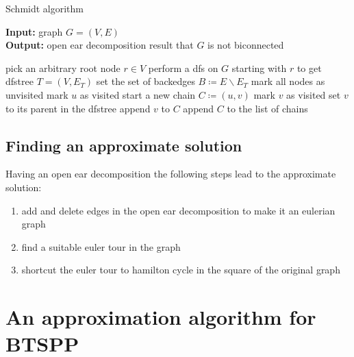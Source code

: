 \begin{algorithm}
  \caption{Schmidt algorithm}\label{alg:schmidt}
  \textbf{Input: } graph \(G = (V, E)\)\\
  \textbf{Output: } open ear decomposition result that \(G\) is not biconnected
  \begin{algorithmic}[1]
      \State pick an arbitrary root node \(r \in V\)
      \State perform a \gls{dfs} on \(G\) starting with \(r\) to get \gls{dfstree} \(T = (V, E_T)\)
        \State{}
      \EndIf
      \State set the set of backedges \(B \coloneqq E \backslash E_T\)
      \State mark all nodes as unvisited
            \State mark \(u\) as visited
            \State start a new chain \(C \coloneqq (u, v)\)
              \State mark \(v\) as visited
              \State set \(v\) to its parent in the \gls{dfstree}
              \State append \(v\) to \(C\)
                \State{}
              \EndIf
            \EndWhile
            \State append \(C\) to the list of chains
          \EndIf
        \EndFor
      \EndFor
          \State{}
        \EndIf
      \EndFor
      \State{}
    \EndProcedure
  \end{algorithmic}
\end{algorithm}

\subsection{Finding an approximate solution}
Having an open ear decomposition the following steps lead to the approximate solution:
\begin{enumerate}
  \item add and delete edges in the open ear decomposition to make it an eulerian graph
  \item find a suitable euler tour in the graph
  \item shortcut the euler tour to hamilton cycle in the square of the original graph
\end{enumerate}

\section{An approximation algorithm for BTSPP}